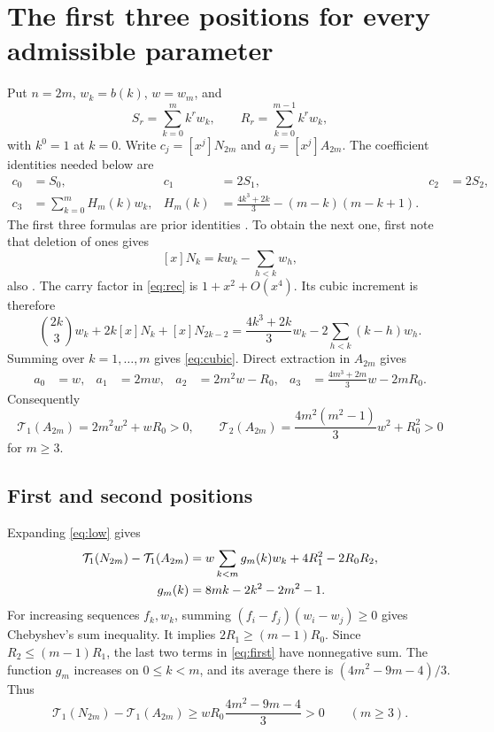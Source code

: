 \documentclass[11pt]{article}
\newcommand{\T}{\mathcal T}
\begin{document}
\section{The first three positions for every admissible parameter}
Put $n=2m$, $w_k=b(k)$, $w=w_m$, and
\[
 S_r=\sum_{k=0}^m k^rw_k,\qquad R_r=\sum_{k=0}^{m-1}k^rw_k,
\]
with $k^0=1$ at $k=0$. Write $c_j=[x^j]N_{2m}$ and $a_j=[x^j]A_{2m}$.
The coefficient identities needed below are
\begin{align}
 c_0&=S_0,&c_1&=2S_1,&c_2&=2S_2,\label{eq:low}\\
 c_3&=\sum_{k=0}^m H_m(k)w_k,&
 H_m(k)&=\frac{4k^3+2k}{3}-(m-k)(m-k+1).\label{eq:cubic}
\end{align}
The first three formulas are prior identities
\cite[Corollary 4.5 and Remark 8]{BBFM}.
To obtain the next one, first note that deletion of ones gives
\begin{equation}\label{eq:linear}
 [x]N_k=kw_k-\sum_{h<k}w_h,
\end{equation}
also \cite[Corollary 4.2]{BBFM}. The carry factor in \eqref{eq:rec} is
$1+x^2+O(x^4)$. Its cubic increment is therefore
\[
 \binom{2k}{3}w_k+2k[x]N_k+[x]N_{2k-2}
 =\frac{4k^3+2k}{3}w_k-2\sum_{h<k}(k-h)w_h.
\]
Summing over $k=1,\ldots,m$ gives \eqref{eq:cubic}.
Direct extraction in $A_{2m}$ gives
\begin{align*}
 a_0&=w,&a_1&=2mw,&a_2&=2m^2w-R_0,&
 a_3&=\frac{4m^3+2m}{3}w-2mR_0.
\end{align*}
Consequently
\begin{equation}\label{eq:apos}
 \T_1(A_{2m})=2m^2w^2+wR_0>0,\qquad
 \T_2(A_{2m})=\frac{4m^2(m^2-1)}3w^2+R_0^2>0
\end{equation}
for $m\ge3$.

\subsection{First and second positions}
Expanding \eqref{eq:low} gives
\begin{align}
 \T_1(N_{2m})-\T_1(A_{2m})
 &=w\sum_{k<m}g_m(k)w_k+4R_1^2-2R_0R_2,\label{eq:first}\\
 g_m(k)&=8mk-2k^2-2m^2-1.\notag
\end{align}
For increasing sequences $f_k,w_k$, summing
$(f_i-f_j)(w_i-w_j)\ge0$ gives Chebyshev's sum inequality.
It implies $2R_1\ge(m-1)R_0$. Since $R_2\le(m-1)R_1$, the last two terms
in \eqref{eq:first} have nonnegative sum. The function $g_m$ increases on
$0\le k<m$, and its average there is $(4m^2-9m-4)/3$. Thus
\[
 \T_1(N_{2m})-\T_1(A_{2m})
 \ge wR_0\frac{4m^2-9m-4}{3}>0\qquad(m\ge3).
\]
\end{document}
